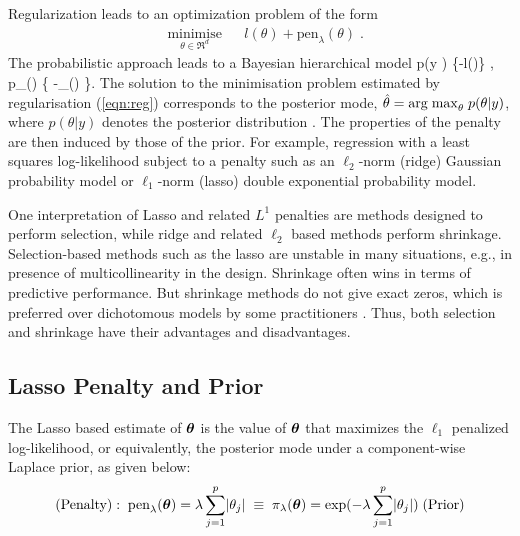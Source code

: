 \documentclass[11pt]{article}
\begin{document}
Regularization leads to an optimization problem of the form 
\begin{equation}
\label{eqn:reg}
\begin{aligned}
& \underset{\theta \in \Re^d}{\text{minimise}}
& & l(\theta) + \text{pen}_{\lambda}(\theta) \; . 
\end{aligned}
\end{equation}
The probabilistic approach leads to a Bayesian hierarchical model
\beq
p(y \mid \theta) \propto \exp\{-l(\theta)\} \; , \quad p_{\lambda}(\theta) \propto \exp\{ -_{\lambda}(\theta) \}. \label{eq:pen}
\eeq
The solution to the minimisation problem estimated by regularisation (\ref{eqn:reg}) corresponds to the posterior mode, $ \hat{\theta} = {\rm arg \; max}_\theta \; p( \theta|y) $, where $ p(\theta|y)$ denotes the posterior distribution \citep{polson2015mixtures}. The properties of the penalty are then induced by those of the prior. For example, regression with a least squares log-likelihood subject to a penalty such as an $\ell_2$-norm (ridge) \citep{hoerl70} Gaussian probability model or $\ell_1$-norm (lasso) \citep{tibshirani96} double exponential probability model. 

One interpretation of Lasso and related $L^1$ penalties are methods designed to perform selection, while ridge and related $\ell_2$ based methods perform shrinkage. Selection-based methods such as the lasso are unstable in many situations, e.g., in presence of multicollinearity in the design. Shrinkage often wins in terms of predictive performance. But shrinkage methods do not give exact zeros, which is preferred over dichotomous models by some practitioners \citep{stephens2009bayesian}. Thus, both selection and shrinkage have their advantages and disadvantages. 

\subsection{Lasso Penalty and Prior}\label{sec:lasso}

The Lasso based estimate of $\boldsymbol{\theta}$ is the value of $\boldsymbol{\theta}$ that maximizes the $\ell_1$ penalized log-likelihood, or equivalently, the posterior mode under a component-wise Laplace prior, as given below: 
\begin{equation}
(\text{Penalty}): \; \text{pen}_{\lambda}(\boldsymbol{\theta}) = \lambda \sum_{j = 1}^{p} \lvert\theta_j\rvert \; \equiv \; \pi_{\lambda}(\boldsymbol{\theta}) = \exp( - \lambda \sum_{j = 1}^{p} \lvert\theta_j\rvert) \; (\text{Prior})
\end{equation}
\end{document}
